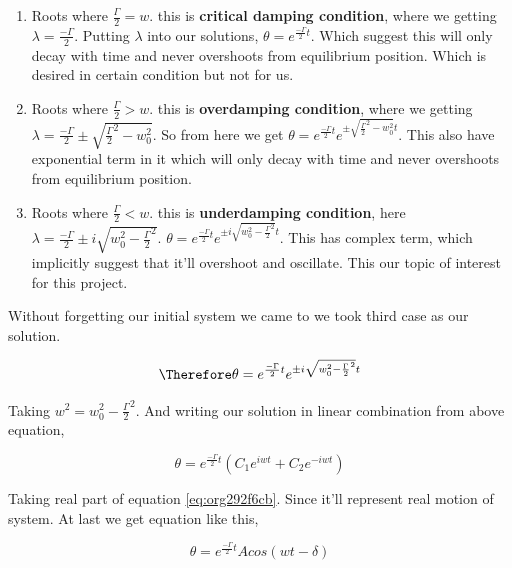 \documentclass[11pt,a4paper]{article}
\begin{document}
\begin{enumerate}
\item Roots where \(\frac{\Gamma}{2}=w\). this is \textbf{critical damping condition}, where we getting \(\lambda=\frac{-\Gamma}{2}\). Putting \(\lambda\) into our solutions, \(\theta = e^{\frac{-\Gamma}{2}t}\). Which suggest this will only decay with time and never overshoots from equilibrium position. Which is desired in certain condition but not for us.

\item Roots where \(\frac{\Gamma}{2}>w\). this is \textbf{overdamping condition}, where we getting \(\lambda=\frac{-\Gamma}{2}\pm\sqrt{\frac{\Gamma}{2}^{2}-w_{0}^{2}}\). So from here we get \(\theta = e^{\frac{-\Gamma}{2}t}e^{\pm\sqrt{\frac{\Gamma}{2}^{2}-w_{0}^{2}}t}\). This also have exponential term in it which will only decay with time and never overshoots from equilibrium position.

\item Roots where \(\frac{\Gamma}{2}<w\). this is \textbf{underdamping condition}, here  \(\lambda=\frac{-\Gamma}{2}\pm i\sqrt{w_{0}^{2}-\frac{\Gamma}{2}^{2}}\). \(\theta = e^{\frac{-\Gamma}{2}t}e^{\pm i \sqrt{w_{0}^{2}-\frac{\Gamma}{2}^{2}}t}\). This has complex term, which implicitly suggest that it'll overshoot and oscillate. This our topic of interest for this project.
\end{enumerate}


Without forgetting our initial system we came to we took third case as our solution.

\begin{equation*}
\label{eq:orge594baf}
\Therefore \theta = e^{\frac{-\Gamma}{2}t}e^{\pm i \sqrt{w_{0}^{2}-\frac{\Gamma}{2}^{2}}t}
\end{equation*}

Taking \(w^{2} = w_{0}^{2}-\frac{\Gamma}{2}^{2}\). And writing our solution in linear combination from above equation,

\begin{equation}
\label{eq:org292f6cb}
\theta = e^{\frac{-\Gamma}{2}t}(C_{1}e^{iwt}+C_{2}e^{-iwt})
\end{equation}

Taking real part of equation \ref{eq:org292f6cb}. Since it'll represent real motion of system. At last we get equation like this,

\begin{equation}
\label{eq:orga5d27d2}
\theta = e^{\frac{-\Gamma}{2}t}A cos(wt-\delta)
\end{equation}
\end{document}
